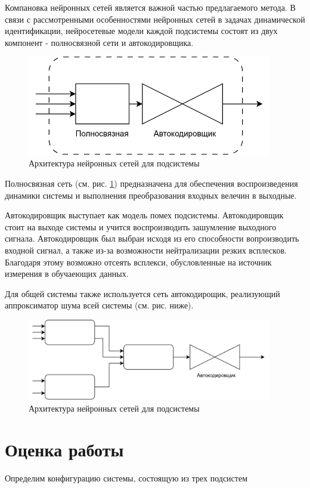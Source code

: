 Компановка нейронных сетей является важной частью предлагаемого метода. В связи с рассмотренными особенностями нейронных сетей в задачах динамической идентификации, нейросетевые модели каждой подсистемы состоят из двух компонент - полносвязной сети и автокодировщика. 

\begin{figure}[H]
  \begin{center}
    \includegraphics[width=0.95\textwidth]{figures/nn_system.png}
  \end{center}
  \caption{Архитектура нейронных сетей для подсистемы}\label{fig:nn:system}
\end{figure}

Полносвязная сеть (см. рис. \ref{fig:nn:system}) предназначена для обеспечения воспроизведения динамики системы и выполнения преобразования входных велечин в выходные. 

Автокодировщик выступает как модель помех подсистемы. Автокодировщик стоит на выходе системы и учится воспроизводить зашумление выходного сигнала. Автокодировщик был выбран исходя из его способности вопроизводить входной сигнал, а также из-за возможности нейтрализации резких всплесков. Благодаря этому возможно отсеять всплекси, обусловленные на источник измерения в обучаеющих данных. 


Для общей системы также используется сеть автокодирощик, реализующий аппроксиматор шума всей системы (см. рис. ниже).

\begin{figure}[H]
  \begin{center}
    \includegraphics[width=0.95\textwidth]{figures/nn_full.png}
  \end{center}
  \caption{Архитектура нейронных сетей для подсистемы}\label{fig:nn:full}
\end{figure}

\section{Оценка работы}

Определим конфигурацию системы, состоящую из трех подсистем
